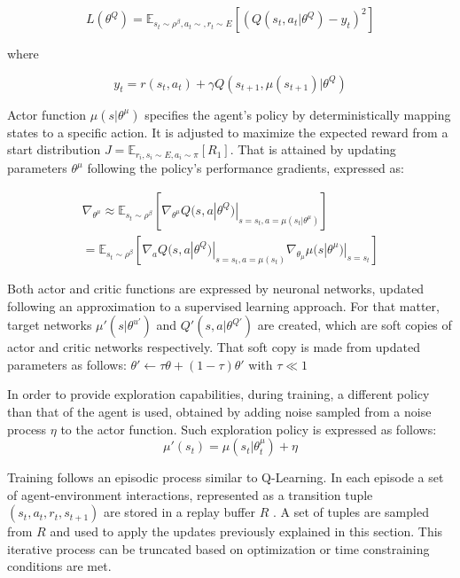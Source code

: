 \documentclass[peerreview]{IEEEtran}
\begin{document}
 \begin{equation}
   L(\theta^Q) = \mathbb{E}_{s_t \sim \rho^\beta, a_t \sim, r_t \sim E}[(Q(s_t,a_t|\theta^Q)- y_t)^2]
 \end{equation}
 
 where
 
 \begin{equation}
 	y_t = r(s_t, a_t) + \gamma Q(s_{t+1}, \mu(s_{t+1})|\theta^Q)
 \end{equation}
 
Actor function $\mu(s|\theta^\mu)$ specifies the agent's policy by deterministically mapping states to a specific action. It is adjusted to maximize the expected reward from a start distribution $J=\mathbb{E}_{r_i, s_i \sim E, a_i \sim \pi}[R_1]$. That is attained by updating parameters $\theta^\mu$ following the policy's performance gradients, expressed as:

\begin{equation}
\begin{split}
	\nabla_{\theta^\mu} \approx \mathbb{E}_{s_t \sim \rho^\beta}[\nabla_{\theta^\mu}Q(s,a|\theta^Q)|_{s=s_t, a=\mu(s_t|\theta^\mu)}] \\	
	= \mathbb{E}_{s_t \sim \rho ^ \beta}[\nabla_a Q(s,a|\theta^Q)|_{s=s_t, a=\mu(s_t)} \nabla_{\theta_\mu} \mu(s|\theta^\mu)|_{s=s_t}]
	\end{split}
\end{equation}

 Both actor and critic functions are expressed by neuronal networks, updated following an approximation to a supervised learning approach. For that matter, target networks $\mu'(s|\theta^{u'})$ and $Q'(s,a|\theta^{Q'})$ are created, which are soft copies of actor and critic networks respectively. That soft copy is made from updated parameters as follows: $\theta'\leftarrow \tau \theta + (1-\tau)\theta'$ with $\tau \ll 1$
 
 In order to provide exploration capabilities, during training, a different policy than that of the agent is used, obtained by adding noise sampled from a noise process $\eta$ to the actor function. Such exploration policy is expressed as follows: 
 \begin{equation}
 	\mu'(s_t)=\mu(s_t|\theta_t^\mu ) + \eta
 \end{equation}
 
Training follows an episodic process similar to Q-Learning. In each episode a set of agent-environment interactions, represented as a transition tuple $(s_t, a_t, r_t, s_{t+1})$ are stored in a replay buffer $R$ \cite{replay_buffer_2015}. A set of tuples are sampled from $R$ and used to apply the updates previously explained in this section. This iterative process can be truncated based on optimization or time constraining conditions are met.
\end{document}
